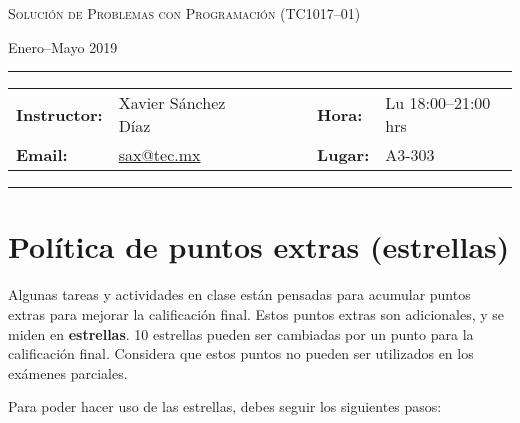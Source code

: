 \documentclass[12pt, letterpaper, oneside]{article}
\makeatletter
\newcommand{\thecourse}{Solución de Problemas con Programación (TC1017--01)}
\newcommand{\thesemester}{Enero--Mayo 2019}
\newcommand{\theinstructor}{Xavier Sánchez Díaz}
\newcommand{\themail}{sax@tec.mx}
\newcommand{\thetime}{Lu 18:00--21:00 hrs}
\newcommand{\theplace}{A3-303}
\makeatother
\begin{document}
  \begin{center}
  {\Large \textsc{\thecourse}}
  \end{center}
  \begin{center}
  \thesemester
  \end{center}

  \begin{center}
  \rule{6in}{0.4pt}
  \begin{minipage}[t]{.75\textwidth}
  \begin{tabular}{llcccll}
  \textbf{Instructor:} & \theinstructor & & &  & \textbf{Hora:} & \thetime \\
  \textbf{Email:} &  \href{mailto:sax@tec.mx}{\themail} & & & & \textbf{Lugar:} & \theplace
  \end{tabular}
  \end{minipage}
  \rule{6in}{0.4pt}
  \end{center}
  \vspace{.5cm}
  \setlength{\unitlength}{1in}
  \renewcommand{\arraystretch}{2}

  \section{Política de puntos extras (estrellas)}

  Algunas tareas y actividades en clase están pensadas para acumular puntos extras para mejorar la calificación final.
  Estos puntos extras son adicionales, y se miden en \textbf{estrellas}.
  10 estrellas pueden ser cambiadas por un punto para la calificación final.
  Considera que estos puntos no pueden ser utilizados en los exámenes parciales.

  Para poder hacer uso de las estrellas, debes seguir los siguientes pasos:
\end{document}
